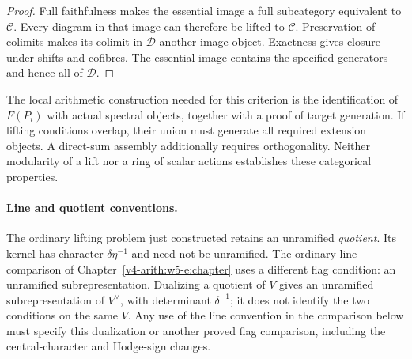 \begin{proof}
Full faithfulness makes the essential image a full subcategory
equivalent to $\mathcal C$. Every diagram in that image can
therefore be lifted to $\mathcal C$.
Preservation of colimits makes its colimit in $\mathcal D$ another
image object. Exactness gives closure under shifts and cofibres.
The essential image contains the specified generators and hence
all of $\mathcal D$.
\end{proof}

The local arithmetic construction needed for this criterion is the
identification of $F(P_i)$ with actual spectral objects, together
with a proof of target generation. If lifting conditions overlap,
their union must generate all required extension objects.
A direct-sum assembly additionally requires orthogonality.
Neither modularity of a lift nor a ring of scalar actions establishes
these categorical properties.

\paragraph{Line and quotient conventions.}
The ordinary lifting problem just constructed retains an unramified
\emph{quotient}. Its kernel has character $\delta\eta^{-1}$ and need
not be unramified. The ordinary-line comparison of Chapter~\ref{v4-arith:w5-e:chapter} uses a different
flag condition: an unramified subrepresentation. Dualizing a quotient
of $V$ gives an unramified subrepresentation of $V^\vee$, with determinant
$\delta^{-1}$; it does not identify the two conditions on the same $V$.
Any use of the line convention in the comparison below must specify
this dualization or another proved flag comparison, including the
central-character and Hodge-sign changes.

